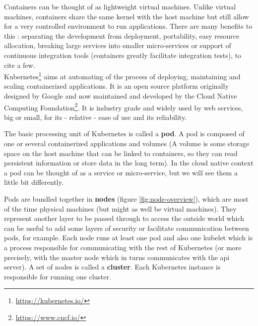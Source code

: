 \documentclass[12pt]{report}
\begin{document}
Containers can be thought of as lightweight virtual machines. Unlike virtual
machines, containers share the same kernel with the host machine but still
allow for a very controlled environment to run applications. There are many
benefits to this : separating the development from deployment, portability,
easy resource allocation, breaking large services into smaller micro-services
or support of continuous integration tools (containers greatly facilitate
integration tests), to cite a few.\\

Kubernetes\footnote{\url{https://kubernetes.io/}} aims at automating of the process of deploying,
maintaining and scaling containerized applications. It is an open source
platform originally designed by Google and now maintained and developed by the
Cloud Native Computing Foundation\footnote{\url{https://www.cncf.io/}}. It is
industry grade and widely used by web services, big or small, for its -
relative - ease of use and its reliability.

The basic processing unit of Kubernetes is called a \textbf{pod}. A pod is composed of
one or several containerized applications and volumes (A volume is some storage
space on the host machine that can be linked to containers, so they can read
persistent information or store data in the long term). In the cloud native
context a pod can be thought of as a service or micro-service, but we will see
them a little bit differently.

Pods are bundled together in \textbf{nodes} (figure \ref{fig:node-overview}),
which are most of the time physical machines (but might as well be virtual
machines). They represent another layer to be passed through to access the
outside world which can be useful to add some layers of security or facilitate
communication between pods, for example. Each node runs at least one pod and
also one kubelet which is a process responsible for communicating with the rest
of Kubernetes (or more precisely, with the master node which in turns
communicates with the api server). A set of nodes is called a \textbf{cluster}.
Each Kubernetes instance is responsible for running one cluster.
\end{document}
